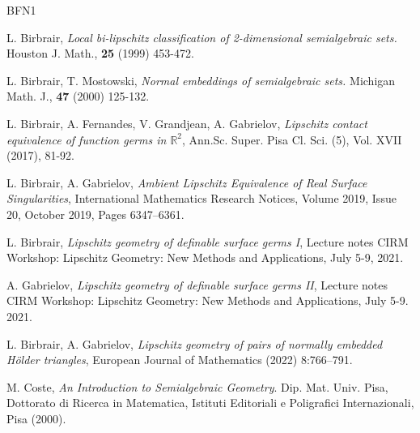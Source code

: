 \documentclass[article]{amsart}
\newcommand{\R}{\mathbb R}
\newcommand{\0}{{\bf 0}}
\begin{document}


 

\noindent

\begin{thebibliography}{BFN1}

 L. Birbrair, {\it Local bi-lipschitz classification of 2-dimensional 
semialgebraic sets.}  Houston J. Math., {\bf 25} (1999) 453-472.

 L. Birbrair, T. Mostowski, {\it Normal embeddings of semialgebraic sets.}  Michigan Math. J., {\bf 47} (2000) 125-132.

 L. Birbrair, A. Fernandes, V. Grandjean, A. Gabrielov, {\it Lipschitz contact equivalence of function germs in $\R^2$}, Ann.Sc. Super. Pisa Cl. Sci. (5), Vol. XVII (2017), 81-92. 

	
L. Birbrair, A. Gabrielov, {\it Ambient Lipschitz Equivalence of Real Surface Singularities}, International Mathematics Research Notices, Volume 2019, Issue 20, October 2019, Pages 6347–6361.

L. Birbrair, {\it Lipschitz geometry of definable surface germs I}, Lecture notes CIRM Workshop: Lipschitz Geometry: New Methods and Applications, July 5-9, 2021.

A. Gabrielov, {\it Lipschitz geometry of definable surface germs II}, Lecture notes CIRM Workshop: Lipschitz Geometry: New Methods and Applications, July 5-9. 2021.

L. Birbrair, A. Gabrielov, {\it Lipschitz geometry of pairs of normally embedded Hölder
	triangles}, European Journal of Mathematics (2022) 8:766–791.
	
M. Coste, {\it An Introduction to Semialgebraic Geometry}. Dip. Mat. Univ. Pisa, Dottorato di Ricerca in Matematica, Istituti Editoriali e Poligrafici Internazionali, Pisa (2000).


\end{thebibliography}
\end{document}
